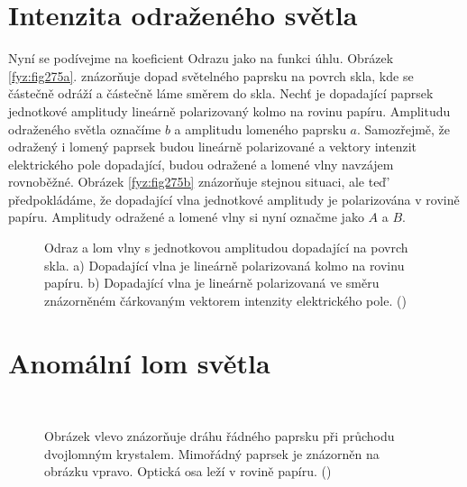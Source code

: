   \section{Intenzita odraženého světla}\label{fyz:IchapXXXIIIsecVI}
    Nyní se podívejme na koeﬁcient Odrazu jako na funkci úhlu. Obrázek \ref{fyz:fig275a}. znázorňuje
    dopad světelného paprsku na povrch skla, kde se částečně odráží a částečně láme směrem do skla.
    Nechť je dopadající paprsek jednotkové amplitudy lineárně polarizovaný kolmo na rovinu papíru.
    Amplitudu odraženého světla označíme \(b\) a amplitudu lomeného paprsku \(a\). Samozřejmě, že
    odražený i lomený paprsek budou lineárně polarizované a vektory intenzit elektrického pole
    dopadající, budou odražené a lomené vlny navzájem rovnoběžné. Obrázek \ref{fyz:fig275b}
    znázorňuje stejnou situaci, ale teď' předpokládáme, že dopadající vlna jednotkové amplitudy je
    polarizována v rovině papíru. Amplitudy odražené a lomené vlny si nyní označme jako \(A\) a
    \(B\).
  
    \begin{figure}[ht!]  %
      \centering
      \caption{Odraz a lom vlny s jednotkovou amplitudou dopadající na povrch skla. a) Dopadající
              vlna je lineárně polarizovaná kolmo na rovinu papíru. b) Dopadající vlna je lineárně
              polarizovaná ve směru znázorněném čárkovaným vektorem intenzity elektrického pole.      
              (\cite[s.~437]{Feynman01})}
      \label{fyz:fig275}
    \end{figure}

  \section{Anomální lom světla}\label{fyz:IchapXXXIIIsecVIII}

    \begin{figure}[ht!]  %
      \centering
       \\
      \caption{Obrázek vlevo znázorňuje dráhu řádného paprsku při průchodu dvojlomným krystalem.
              Mimořádný paprsek je znázorněn na obrázku vpravo. Optická osa leží v rovině papíru.
              (\cite[s.~437]{Feynman01})}
      \label{fyz:fig276}
    \end{figure}

